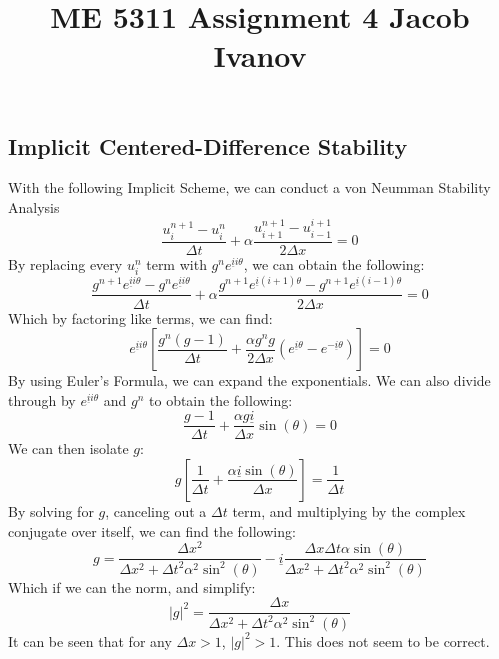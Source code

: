 \documentclass[12pt, reqno]{amsart}
\begin{document}
\title{ME 5311 \quad Assignment 4 \quad Jacob Ivanov}

\maketitle
\begin{multicols}{2}
    \section{Implicit Centered-Difference Stability}
    With the following Implicit Scheme, we can conduct a von Neumman Stability Analysis
    \begin{equation}
        \frac{u_i^{n+1} - u_i^n}{\Delta t} + \alpha \frac{u_{i+1}^{n+1} - u_{i-1}^{i+1}}{2 \Delta x} = 0
    \end{equation}
    By replacing every $u_i^n$ term with $g^n e^{\underline{i} i \theta} $, we can obtain the following:
    \begin{equation}
        \frac{g^{n+1} e^{\underline{i} i \theta} - g^n e^{\underline{i} i \theta}}{\Delta t} + \alpha \frac{g^{n+1} e^{\underline{i} (i+1) \theta} - g^{n+1} e^{\underline{i} (i-1) \theta}}{2 \Delta x} = 0
    \end{equation}
    Which by factoring like terms, we can find:
    \begin{equation}
        e^{\underline{i} i \theta} \left[ \frac{g^n (g-1)}{\Delta t} + \frac{\alpha g^n g}{2 \Delta x} \left( e^{\underline{i} \theta} - e^{- \underline{i} \theta} \right) \right] = 0
    \end{equation}
    By using Euler's Formula, we can expand the exponentials. We can also divide through by $e^{\underline{i} i \theta}$ and $g^n$ to obtain the following:
    \begin{equation}
        \frac{g-1}{\Delta t} + \frac{\alpha g \underline{i}}{\Delta x} \sin(\theta) = 0
    \end{equation}
    We can then isolate $g$:
    \begin{equation}
        g \left[ \frac{1}{\Delta t} + \frac{\alpha \underline{i} \sin(\theta)}{\Delta x} \right] = \frac{1}{\Delta t}
    \end{equation}
    By solving for $g$, canceling out a $\Delta t$ term, and multiplying by the complex conjugate over itself, we can find the following:
    \begin{equation}
        g = \frac{\Delta x^2}{\Delta x^2 + \Delta t^2 \alpha^2 \sin^2 (\theta)} - \underline{i} \frac{\Delta x \Delta t \alpha \sin(\theta)}{\Delta x^2 + \Delta t^2 \alpha^2 \sin^2 (\theta)}
    \end{equation}
    Which if we can the norm, and simplify:
    \begin{equation}
        |g|^2 = \frac{\Delta x}{\Delta x^2 + \Delta t^2 \alpha^2 \sin^2 (\theta)}
    \end{equation}
    It can be seen that for any $\Delta x > 1$, $|g|^2 > 1$. This does not seem to be correct. 

\end{multicols}
\end{document}
